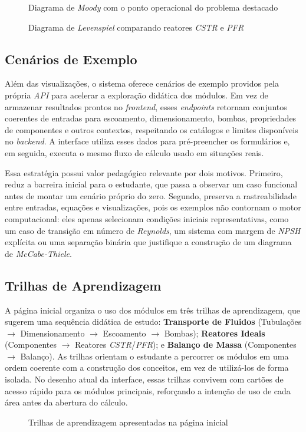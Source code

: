 \begin{figure}[H]
    \centering
    \caption{Diagrama de \textit{Moody} com o ponto operacional do problema destacado}
    \label{fig:viz_moody}
\end{figure}

\begin{figure}[H]
    \centering
    \caption{Diagrama de \textit{Levenspiel} comparando reatores \textit{CSTR} e \textit{PFR}}
    \label{fig:viz_levenspiel}
\end{figure}

\subsection{Cenários de Exemplo}

Além das visualizações, o sistema oferece cenários de exemplo providos pela própria \textit{API} para acelerar a exploração didática dos módulos. Em vez de armazenar resultados prontos no \textit{frontend}, esses \textit{endpoints} retornam conjuntos coerentes de entradas para escoamento, dimensionamento, bombas, propriedades de componentes e outros contextos, respeitando os catálogos e limites disponíveis no \textit{backend}. A interface utiliza esses dados para pré-preencher os formulários e, em seguida, executa o mesmo fluxo de cálculo usado em situações reais.

Essa estratégia possui valor pedagógico relevante por dois motivos. Primeiro, reduz a barreira inicial para o estudante, que passa a observar um caso funcional antes de montar um cenário próprio do zero. Segundo, preserva a rastreabilidade entre entradas, equações e visualizações, pois os exemplos não contornam o motor computacional: eles apenas selecionam condições iniciais representativas, como um caso de transição em número de \textit{Reynolds}, um sistema com margem de \textit{NPSH} explícita ou uma separação binária que justifique a construção de um diagrama de \textit{McCabe-Thiele}.

\subsection{Trilhas de Aprendizagem}

A página inicial organiza o uso dos módulos em três trilhas de aprendizagem, que sugerem uma sequência didática de estudo: \textbf{Transporte de Fluidos} (Tubulações $\rightarrow$ Dimensionamento $\rightarrow$ Escoamento $\rightarrow$ Bombas); \textbf{Reatores Ideais} (Componentes $\rightarrow$ Reatores \textit{CSTR}/\textit{PFR}); e \textbf{Balanço de Massa} (Componentes $\rightarrow$ Balanço). As trilhas orientam o estudante a percorrer os módulos em uma ordem coerente com a construção dos conceitos, em vez de utilizá-los de forma isolada. No desenho atual da interface, essas trilhas convivem com cartões de acesso rápido para os módulos principais, reforçando a intenção de uso de cada área antes da abertura do cálculo.

\begin{figure}[H]
    \centering
    \caption{Trilhas de aprendizagem apresentadas na página inicial}
    \label{fig:trilhas}
\end{figure}
